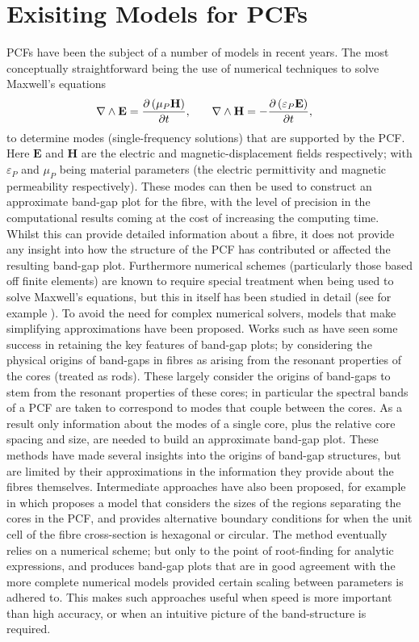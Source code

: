 \section{Exisiting Models for PCFs} \label{sec:ExistingPCFModels}
PCFs have been the subject of a number of models in recent years. 
The most conceptually straightforward being the use of numerical techniques to solve Maxwell's equations
\begin{align*}
	\nabla\wedge\mathbf{E} &= \dfrac{\partial \left( \mu_{P}\mathbf{H} \right)}{\partial t}, 
	&\quad \nabla\wedge\mathbf{H} &= -\dfrac{\partial \left( \varepsilon_{P}\mathbf{E} \right)}{\partial t},	
\end{align*} 
to determine modes (single-frequency solutions) that are supported by the PCF.
Here $\mathbf{E}$ and $\mathbf{H}$ are the electric and magnetic-displacement fields respectively; with $\varepsilon_{P}$ and $\mu_{P}$ being material parameters (the electric permittivity and magnetic permeability respectively).
These modes can then be used to construct an approximate band-gap plot for the fibre, with the level of precision in the computational results coming at the cost of increasing the computing time.
Whilst this can provide detailed information about a fibre, it does not provide any insight into how the structure of the PCF has contributed or affected the resulting band-gap plot.
Furthermore numerical schemes (particularly those based off finite elements) are known to require special treatment when being used to solve Maxwell's equations, but this in itself has been studied in detail (see for example \cite{monk2003finite}).
To avoid the need for complex numerical solvers, models that make simplifying approximations have been proposed.
Works such as  have seen some success in retaining the key features of band-gap plots; by considering the physical origins of band-gaps in fibres as arising from the resonant properties of the cores (treated as rods).
These largely consider the origins of band-gaps to stem from the resonant properties of these cores; in particular the spectral bands of a PCF are taken to correspond to modes that couple between the cores.
As a result only information about the modes of a single core, plus the relative core spacing and size, are needed to build an approximate band-gap plot.
These methods have made several insights into the origins of band-gap structures, but are limited by their approximations in the information they provide about the fibres themselves.
Intermediate approaches have also been proposed, for example in \cite{birks2006approximate} which proposes a model that considers the sizes of the regions separating the cores in the PCF, and provides alternative boundary conditions for when the unit cell of the fibre cross-section is hexagonal or circular.
The method eventually relies on a numerical scheme; but only to the point of root-finding for analytic expressions, and produces band-gap plots that are in good agreement with the more complete numerical models provided certain scaling between parameters is adhered to.
This makes such approaches useful when speed is more important than high accuracy, or when an intuitive picture of the band-structure is required. \newline

